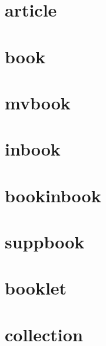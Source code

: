 \documentclass{article}
\begin{document}
\section{article}

\cite[1]{article}

\cite[1]{article}

\section{book}

\cite[1]{book}

\cite[1]{book}

\section{mvbook}

\cite[1]{mvbook}

\cite[1]{mvbook}

\section{inbook}

\cite[1]{inbook}

\cite[1]{inbook}

\section{bookinbook}

\cite[1]{bookinbook}

\cite[1]{bookinbook}

\section{suppbook}

\cite[1]{suppbook}

\cite[1]{suppbook}

\section{booklet}

\cite[1]{booklet}

\cite[1]{booklet}

\section{collection}

\cite[1]{collection}
\end{document}
